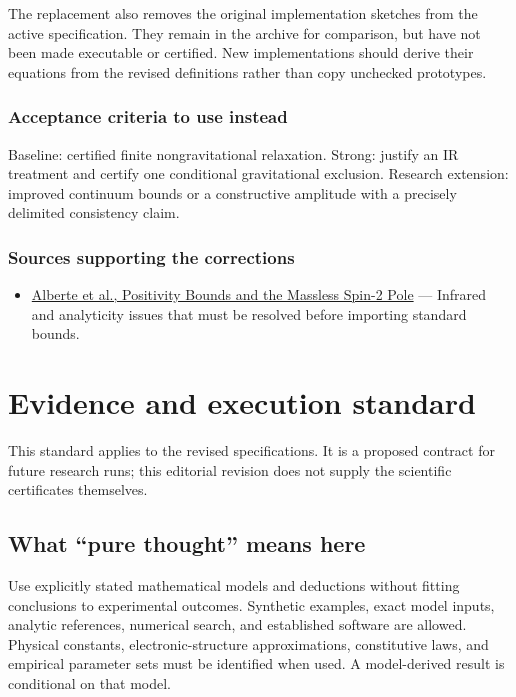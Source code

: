 \documentclass[
  11pt,
]{article}
\providecommand{\tightlist}{%
  \setlength{\itemsep}{0pt}\setlength{\parskip}{0pt}}
\begin{document}
The replacement also removes the original implementation sketches from
the active specification. They remain in the archive for comparison, but
have not been made executable or certified. New implementations should
derive their equations from the revised definitions rather than copy
unchecked prototypes.

\subsubsection{Acceptance criteria to use instead}

Baseline: certified finite nongravitational relaxation. Strong: justify
an IR treatment and certify one conditional gravitational exclusion.
Research extension: improved continuum bounds or a constructive
amplitude with a precisely delimited consistency claim.

\subsubsection{Sources supporting the corrections}

\begin{itemize}
\tightlist
\item
  \href{https://arxiv.org/abs/2007.12667}{Alberte et al., Positivity
  Bounds and the Massless Spin-2 Pole} --- Infrared and analyticity
  issues that must be resolved before importing standard bounds.
\end{itemize}

\section{Evidence and execution standard}

This standard applies to the revised specifications. It is a proposed
contract for future research runs; this editorial revision does not
supply the scientific certificates themselves.

\subsection{What ``pure thought'' means here}

Use explicitly stated mathematical models and deductions without fitting
conclusions to experimental outcomes. Synthetic examples, exact model
inputs, analytic references, numerical search, and established software
are allowed. Physical constants, electronic-structure approximations,
constitutive laws, and empirical parameter sets must be identified when
used. A model-derived result is conditional on that model.
\end{document}

